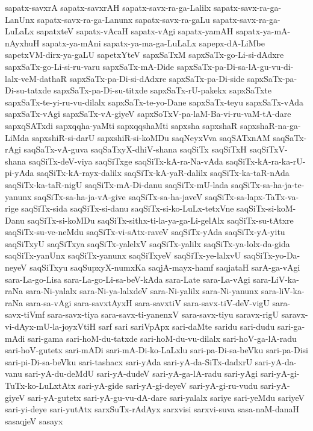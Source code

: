 {sapatx-savxrA
sapatx-savxrAH
sapatx-savx-ra-ga-Lalilx
sapatx-savx-ra-ga-LanUnx
sapatx-savx-ra-ga-Lanunx
sapatx-savx-ra-gaLu
sapatx-savx-ra-ga-LuLaLx
sapatxteV
sapatx-vAcaH
sapatx-vAgi
sapatx-yamAH
sapatx-ya-mA-nAyxhuH
sapatx-ya-mAni
sapatx-ya-ma-ga-LuLaLx
sapepx-dA-LiMbe
sapetxVM-dirx-ya-gaLU
sapetxYteV
sapxSaTxM
sapxSaTx-go-Li-si-dAdxre
sapxSaTx-go-Li-si-ru-varu
sapxSaTx-mA-Dide
sapxSaTx-pa-Di-sa-lA-gu-vu-di-lalx-veM-dathaR
sapxSaTx-pa-Di-si-dAdxre
sapxSaTx-pa-Di-side
sapxSaTx-pa-Di-su-tatxde
sapxSaTx-pa-Di-su-titxde
sapxSaTx-rU-pakekx
sapxSaTxte
sapxSaTx-te-yi-ru-vu-dilalx
sapxSaTx-te-yo-Dane
sapxSaTx-teyu
sapxSaTx-vAda
sapxSaTx-vAgi
sapxSaTx-vA-giyeV
sapxSoTxV-pa-laM-Ba-vi-ru-vaM-tA-dare
sapxqSATxdi
sapxqqha-yaMti
sapxqqshaMti
sapxsha
sapxshaR
sapxshaR-na-ga-LiMda
sapxshiR-si-darU
sapxshiR-si-koMDu
saqNeyxVva
saqSATxnAM
saqSaTx-rAgi
saqSaTx-vA-guva
saqSaTxyX-dhiV-shana
saqSiTx
saqSiTxH
saqSiTxV-shana
saqSiTx-deV-viya
saqSiTxge
saqSiTx-kA-ra-Na-vAda
saqSiTx-kA-ra-ka-rU-pi-yAda
saqSiTx-kA-rayx-dalilx
saqSiTx-kA-yaR-dalilx
saqSiTx-ka-taR-nAda
saqSiTx-ka-taR-nigU
saqSiTx-mA-Di-danu
saqSiTx-mU-lada
saqSiTx-sa-ha-ja-te-yanunx
saqSiTx-sa-ha-ja-vA-give
saqSiTx-sa-ha-javeV
saqSiTx-sa-lapx-TaTx-va-rige
saqSiTx-sida
saqSiTx-si-danu
saqSiTx-si-ko-LuLx-tetxVne
saqSiTx-si-koM-Danu
saqSiTx-si-koMDu
saqSiTx-sithx-ti-la-ya-ga-Li-gelAlx
saqSiTx-su-tAtxre
saqSiTx-su-ve-neMdu
saqSiTx-vi-sAtx-raveV
saqSiTx-yAda
saqSiTx-yA-yitu
saqSiTxyU
saqSiTxya
saqSiTx-yalelxV
saqSiTx-yalilx
saqSiTx-ya-lolx-da-gida
saqSiTx-yanUnx
saqSiTx-yanunx
saqSiTxyeV
saqSiTx-ye-lalxvU
saqSiTx-yo-Da-neyeV
saqSiTxyu
saqSupxyX-numxKa
saqjA-mayx-hamf
saqjataH
sarA-ga-vAgi
sara-La-go-Lisa
sara-La-go-Li-sa-beV-kAda
sara-Late
sara-La-vAgi
sara-LiV-ka-raNa
sara-Ni-yalalx
sara-Ni-ya-lalxdeV
sara-Ni-yalilx
sara-Ni-yanunx
sara-liV-ka-raNa
sara-sa-vAgi
sara-savxtAyxH
sara-savxtiV
sara-savx-tiV-deV-vigU
sara-savx-tiVmf
sara-savx-tiya
sara-savx-ti-yanenxV
sara-savx-tiyu
saravx-rigU
saravx-vi-dAyx-mU-la-joyxVtiH
sarf
sari
sariVpApx
sari-daMte
saridu
sari-dudu
sari-ga-mAdi
sari-gama
sari-hoM-du-tatxde
sari-hoM-du-vu-dilalx
sari-hoV-ga-lA-radu
sari-hoV-gutetx
sari-mADi
sari-mA-Di-ko-LaLxlu
sari-pa-Di-sa-beVku
sari-pa-Disi
sari-pi-Di-sa-beVku
sari-tashacx
sari-yAda
sari-yA-da-SiTx-dadxrU
sari-yA-da-vanu
sari-yA-du-deMdU
sari-yA-dudeV
sari-yA-ga-lA-radu
sari-yAgi
sari-yA-gi-TuTx-ko-LuLxtAtx
sari-yA-gide
sari-yA-gi-deyeV
sari-yA-gi-ru-vudu
sari-yA-giyeV
sari-yA-gutetx
sari-yA-gu-vu-dA-dare
sari-yalalx
sariye
sari-yeMdu
sariyeV
sari-yi-deye
sari-yutAtx
sarxSuTx-rAdAyx
sarxvisi
sarxvi-suva
sasa-naM-danaH
sasaqjeV
sasayx
}
